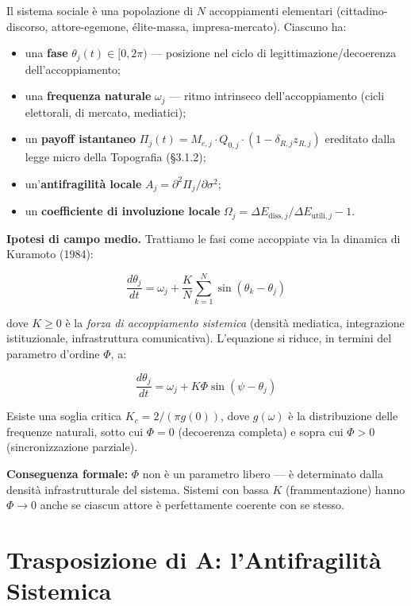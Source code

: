 Il sistema sociale è una popolazione di \(N\) accoppiamenti elementari
(cittadino-discorso, attore-egemone, élite-massa, impresa-mercato).
Ciascuno ha:

\begin{itemize}
\tightlist
\item
  una \textbf{fase} \(\theta_j(t) \in [0, 2\pi)\) --- posizione nel
  ciclo di legittimazione/decoerenza dell'accoppiamento;
\item
  una \textbf{frequenza naturale} \(\omega_j\) --- ritmo intrinseco
  dell'accoppiamento (cicli elettorali, di mercato, mediatici);
\item
  un \textbf{payoff istantaneo}
  \(\Pi_j(t) = M_{e,j} \cdot Q_{0,j} \cdot (1 - \delta_{R,j} z_{R,j})\)
  ereditato dalla legge micro della Topografia (\S{}3.1.2);
\item
  un'\textbf{antifragilità locale}
  \(A_j = \partial^2 \Pi_j / \partial \sigma^2\);
\item
  un \textbf{coefficiente di involuzione locale}
  \(\Omega_j = \Delta E_{\text{diss},j}/\Delta E_{\text{utili},j} - 1\).
\end{itemize}

\Hypoth{} \textbf{Ipotesi di campo medio.} Trattiamo le fasi come
accoppiate via la dinamica di Kuramoto (1984):

\[
\frac{d\theta_j}{dt} = \omega_j + \frac{K}{N}\sum_{k=1}^{N} \sin(\theta_k - \theta_j)
\]

dove \(K \geq 0\) è la \emph{forza di accoppiamento sistemica} (densità
mediatica, integrazione istituzionale, infrastruttura comunicativa).
L'equazione si riduce, in termini del parametro d'ordine \(\Phi\), a:

\[
\frac{d\theta_j}{dt} = \omega_j + K\Phi \sin(\psi - \theta_j)
\]

Esiste una soglia critica \(K_c = 2/(\pi g(0))\), dove \(g(\omega)\) è
la distribuzione delle frequenze naturali, sotto cui \(\Phi = 0\)
(decoerenza completa) e sopra cui \(\Phi > 0\) (sincronizzazione
parziale).

\Proved{} \textbf{Conseguenza formale:} \(\Phi\) non è un parametro
libero --- è determinato dalla densità infrastrutturale del sistema.
Sistemi con bassa \(K\) (frammentazione) hanno \(\Phi \to 0\) anche se
ciascun attore è perfettamente coerente con se stesso.



\section{Trasposizione di A: l'Antifragilità
Sistemica}\label{trasposizione-di-a-lantifragilituxe0-sistemica}

